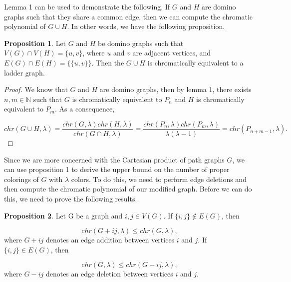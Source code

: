 \documentclass[11pt]{article}
\theoremstyle{definition}
\newcommand{\N}{{\mathbb{N}}}
\newtheorem{prop}{Proposition}
\begin{document}
Lemma 1 can be used to demonstrate the following. If $G$ and $H$ are domino graphs such that they share a common edge, then we can compute the chromatic polynomial of $G \cup H$. In other words, we have the following proposition.

\begin{prop}
Let $G$ and $H$ be domino graphs such that $V(G) \cap V(H) = \{u,v\}$, where $u$ and $v$ are adjacent vertices, and $E(G) \cap E(H) = \{ \{u, v\}\}$. Then the $G \cup H$ is chromatically equivalent to  a ladder graph.
\end{prop}

\begin{proof}
We know that $G$ and $H$ are domino graphs, then by lemma 1, there exists $n,m \in \N$ such that $G$ is chromatically equivalent to $P_n$ and $H$ is chromatically equivalent to $P_m$. As a consequence,

\begin{equation}
chr(G \cup H, \lambda) = \frac{chr(G, \lambda)chr(H, \lambda)}{chr(G \cap H, \lambda)} = \frac{chr(P_n, \lambda)chr(P_m, \lambda)}{\lambda(\lambda - 1)} = chr(P_{n + m - 1}, \lambda). \nonumber
\end{equation}

\end{proof}

Since we are more concerned with the Cartesian product of path graphs $G$, we can use proposition 1 to derive the upper bound on the number of proper colorings of $G$ with $\lambda$ colors. To do this, we need to perform edge deletions and then compute the chromatic polynomial of our modified graph. Before we can do this, we need to prove the following results.

\begin{prop}
Let G be a graph and $i,j \in V(G)$. If $\{i,j\} \not\in E(G)$, then

\begin{equation}
chr(G + ij, \lambda) \leq chr(G, \lambda),
\end{equation} where $G + ij$ denotes an edge addition between vertices $i$ and $j$. If $\{i,j\} \in E(G)$, then

\begin{equation}
chr(G,\lambda) \leq chr(G - ij,\lambda),
\end{equation} where $G - ij$ denotes an edge deletion between vertices $i$ and $j$.

\end{prop}
\end{document}
